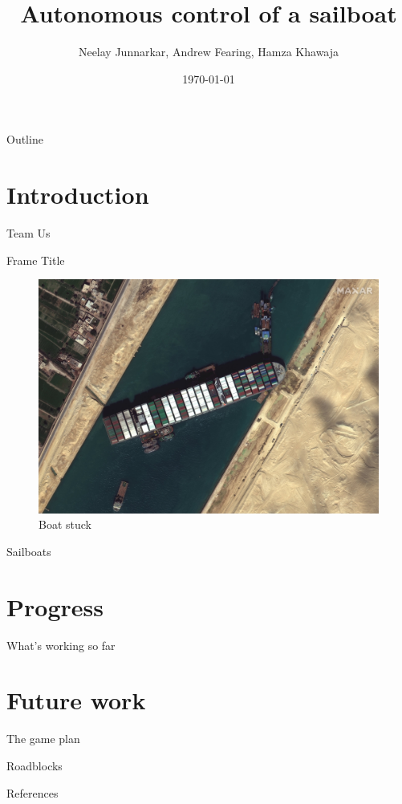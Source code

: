 \documentclass[10pt,xcolor={table,dvipsnames},t]{beamer}
\title[Autosailboat]{Autonomous control of a sailboat}
\author{Neelay Junnarkar, Andrew Fearing, Hamza Khawaja}
\date{\today}
\begin{document}
\begin{frame}
  \titlepage
\end{frame}

\begin{frame}{Outline}
 \tableofcontents
\end{frame}
\section{Introduction}
\begin{frame}{Team}
Us
\end{frame}
\begin{frame}{Frame Title}
    \begin{figure}
        \centering
        \includegraphics[width = 0.3\linewidth]{documents/figures/Suez_Canal_blocked_by_Ever_Given_March_27_2021.jpg}
        \caption{Boat stuck}
        \label{fig:boat_stuck}
    \end{figure}
    Sailboats
\end{frame}

\section{Progress}

\begin{frame}{What's working so far}
    
\end{frame}


\section{Future work}

\begin{frame}{The game plan}

\end{frame}
\begin{frame}{Roadblocks}
    
\end{frame}
\begin{frame}{References}
    \printbibliography{}
\end{frame}
\end{document}
